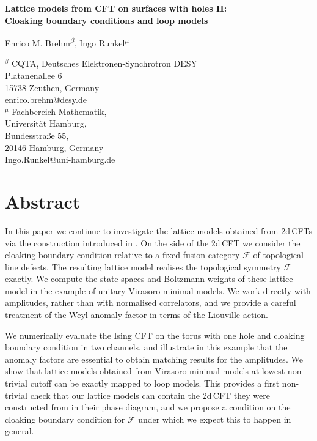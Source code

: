 \documentclass[11pt,a4paper]{article}
\numberwithin{equation}{section}
\begin{document}
 
\thispagestyle{empty}
\phantom{.}
\vspace{.7cm}
\begin{center}{\Large \textbf{
Lattice models from CFT on surfaces with holes II:\\[.5em]
Cloaking boundary conditions and loop models}}
\end{center}

\begin{center}
Enrico M. Brehm\textsuperscript{$\beta$},
Ingo Runkel\textsuperscript{$\mu$}
\end{center}

\begin{center}
	{ ${}^{\beta}$} CQTA, Deutsches Elektronen-Synchrotron DESY\\
    Platanenallee 6\\
    15738 Zeuthen, Germany\\[.5em]
{\small \sf enrico.brehm@desy.de}
\\[1em]
	{${}^{\mu}$} 
Fachbereich Mathematik,\\
Universität Hamburg,\\
Bundesstraße 55,\\
20146 Hamburg, Germany\\[.5em]
{\small \sf Ingo.Runkel@uni-hamburg.de}
\end{center}


\section*{Abstract}
In this paper we continue to investigate the lattice models obtained from 2d\,CFTs via the construction introduced in \cite{Brehm:2021wev}. 
On the side of the 2d\,CFT we consider the cloaking boundary condition relative to a fixed
fusion category $\mathcal{F}$ of topological line defects. The resulting lattice model realises the topological symmetry $\mathcal{F}$ exactly. We compute the state spaces and Boltzmann weights of these lattice model in the example of unitary Virasoro minimal models. We work directly with amplitudes, rather than with normalised correlators, and we provide a careful treatment of the Weyl anomaly factor in terms of the Liouville action. 

We numerically evaluate the Ising CFT on the torus with one hole and cloaking boundary condition in two channels, and illustrate in this example that the anomaly factors are essential to obtain matching results for the amplitudes. We show that lattice models obtained from Virasoro minimal models at lowest non-trivial cutoff can be exactly mapped to loop models. This provides a first non-trivial check that our lattice models can contain the 2d\,CFT they were constructed from in their phase diagram, and we propose a condition on the cloaking boundary condition for $\mathcal{F}$ under which we expect this to happen in general.
\end{document}
